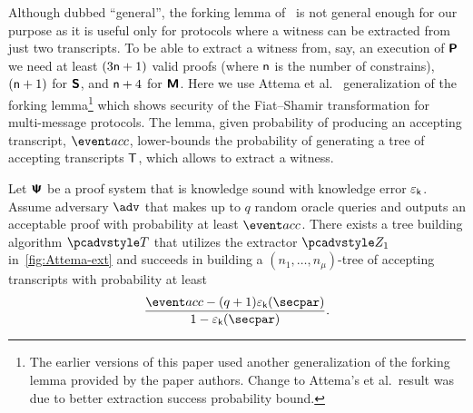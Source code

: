 	

Although dubbed ``general'', the forking lemma of~\cite{CCS:BelNev06} is not general
enough for our purpose as it is useful only for protocols where a witness can be
extracted from just two transcripts. To be able to extract a witness from, say, an
execution of $\bm{\mathsf{P}}$ we need at least $(3 \mathsf{n} + 1)$ valid proofs
(where $\mathsf{n}$ is the number of constrains),
$(\mathsf{n}+ 1)$ for $\bm{\mathsf{S}}$, and $\mathsf{n} + 4$ for $\bm{\mathsf{M}}$. Here we use Attema et
al.~\cite{EPRINT:AttFehKlo21} generalization of the forking lemma\footnote{The
	earlier versions of this paper used another generalization of the forking lemma
	provided by the paper authors. Change to Attema's et al.~result was due to better
	extraction success probability bound.}  which shows security of the Fiat--Shamir
transformation for multi-message protocols. The lemma, given probability of producing
an accepting transcript, $\accProb$, lower-bounds the probability of generating a
tree of accepting transcripts $\mathsf{T}$, which allows to extract a witness.

\begin{lemma}\label{lem:attema}
	 Let $\bm{\mathsf{\Psi}}$ be a proof system that is knowledge sound
	with knowledge error $\varepsilon_{\mathsf{k}}$. Assume adversary $\adv$ that makes up to $q$ random
	oracle queries and outputs an acceptable proof with probability at least
	$\accProb$. There exists a tree building algorithm $\tdv$ that utilizes the extractor $\zdv_1$ in~\cref{fig:Attema-ext} and succeeds in building a
	$(n_1, \ldots, n_\mu)$-tree of accepting transcripts  with probability at least
	\[
	\frac{\accProb - (q + 1) \epsk (\secpar)}{1 - \epsk (\secpar)}.
	\]
	\end{lemma}

